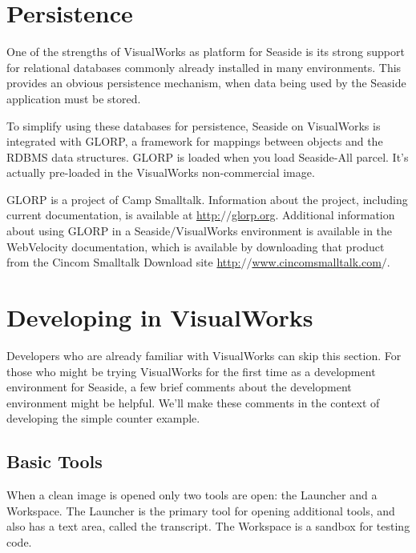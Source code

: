 \documentclass[a4paper,10pt,twoside]{book}
\begin{document}
\section{Persistence}
\label{book:gettingstarted:cincomsmalltalk:persistence}

One of the strengths of VisualWorks as platform for Seaside is its strong support for relational databases commonly already installed in many environments. This provides an obvious persistence mechanism, when data being used by the Seaside application must be stored.

To simplify using these databases for persistence, Seaside on VisualWorks is integrated with GLORP, a framework for mappings between objects and the RDBMS data structures. GLORP is loaded when you load Seaside-All parcel. It's actually pre-loaded in the VisualWorks non-commercial image.

GLORP is a project of Camp Smalltalk. Information about the project, including current documentation, is available at \href{http://glorp.org}{http:$/$$/$glorp.org}. Additional information about using GLORP in a Seaside$/$VisualWorks environment is available in the WebVelocity documentation, which is available by downloading that product from the Cincom Smalltalk Download site \href{http://www.cincomsmalltalk.com/}{http:$/$$/$www.cincomsmalltalk.com$/$}. 

\section{Developing in VisualWorks}
\label{book:gettingstarted:cincomsmalltalk:developing}

Developers who are already familiar with VisualWorks can skip this section. For those who might be trying VisualWorks for the first time as a development environment for Seaside, a few brief comments about the development environment might be helpful. We'll make these comments in the context of developing the simple counter example.

\subsection{Basic Tools}
\label{book:gettingstarted:cincomsmalltalk:developing:tools}

When a clean image is opened only two tools are open: the Launcher and a Workspace. The Launcher is the primary tool for opening additional tools, and also has a text area, called the transcript. The Workspace is a sandbox for testing code.
\end{document}
